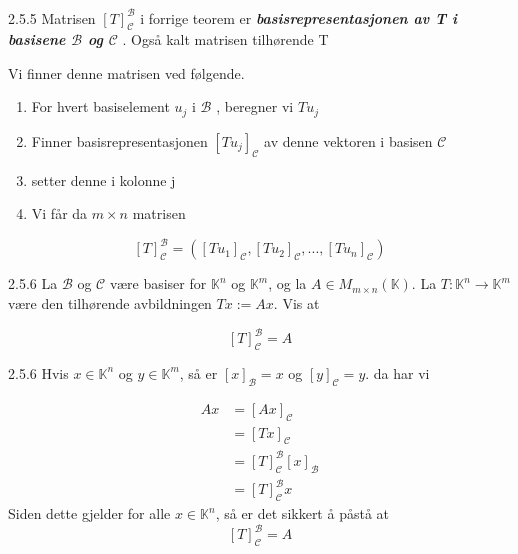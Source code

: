 \documentclass[a4paper,norsk]{article}
\begin{document}
\begin{definitionbox}{2.5.5}{}
Matrisen $ \left[ T \right]_{\mathcal{C}}^{\mathcal{B}}  $ i forrige teorem er \textbf{\textit{basisrepresentasjonen av T i basisene $ \mathcal{B} $ og $ \mathcal{C} $  }}. Også kalt matrisen tilhørende T
\end{definitionbox}

Vi finner denne matrisen ved følgende.
\begin{enumerate}
  \item For hvert basiselement $ u_j $ i $ \mathcal{B} $ , beregner vi $ Tu_j $ 
  \item Finner basisrepresentasjonen $ \left[ Tu_j \right] _{\mathcal{C}} $ av denne vektoren i basisen $ \mathcal{C} $ 
  \item setter denne i kolonne j
  \item Vi får da $ m \times n $ matrisen
\end{enumerate}
\[
    \left[ T \right] _{\mathcal{C}}^{\mathcal{B}} = \left( \left[ Tu_1 \right] _{\mathcal{C}}, \left[ Tu_2 \right] _{\mathcal{C}}, ..., \left[ Tu_n \right] _{\mathcal{C}} \right) 
\]

\begin{oppgavebox}{2.5.6}{}
La $ \mathcal{B} $ og $ \mathcal{C} $ være basiser for $ \mathbb{K}^n $ og $ \mathbb{K}^m$, og la $ A \in M_{m \times n}(\mathbb{K}) $. La $ T: \mathbb{K}^n \rightarrow \mathbb{K}^m$ være den tilhørende avbildningen $ Tx:=Ax $. Vis at

\[
    \left[ T \right] _{\mathcal{C}}^{\mathcal{B}} = A
\]

\begin{proofbox}{2.5.6}{}
Hvis $ x \in  \mathbb{K}^n $ og $ y \in \mathbb{K}^m $, så er $ \left[ x \right] _{\mathcal{B}} = x $ og $ \left[ y \right] _{\mathcal{C}} = y $. da har vi

\begin{align*}
  Ax &= \left[ Ax \right] _{\mathcal{C}} \\
  &= \left[ Tx \right] _{\mathcal{C}} \\
  &= \left[ T \right] _{\mathcal{C}}^{\mathcal{B}} \left[ x \right] _\mathcal{B} \\
  &= \left[ T \right] _{\mathcal{C}}^{\mathcal{B}} x
\end{align*}
Siden dette gjelder for alle $ x \in  \mathbb{K}^n $, så er det sikkert å påstå at 
\[
    \left[ T \right] _{\mathcal{C}}^{\mathcal{B}} = A
\]


\end{proofbox}
\end{oppgavebox}
\end{document}
